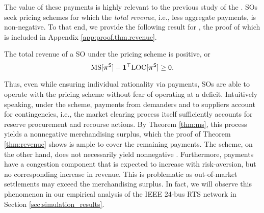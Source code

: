 The value of these \LOC{} payments is highly relevant to the previous study of the \MS{}. SOs seek pricing schemes for which the \emph{total revenue}, i.e., \MS{} less aggregate \LOC{} payments, is non-negative. To that end, we  provide the following result for \LMPmar{}, the proof of which is included in Appendix \ref{app:proof.thm.revenue}.
\begin{theorem}
  \label{thm:revenue}
  The total revenue of a SO under the pricing scheme \LMPmar{} is positive, or
  \begin{equation}
      {\rm MS}{}[{\bm{\pi}}^{{\sf S}}] - \mathbf{1}^\top {\rm LOC}{}[{\bm{\pi}}^{{\sf S}}] \ge 0.
  \end{equation}
\end{theorem}
Thus, even while ensuring individual rationality via \LOC{} payments, SOs are able to operate with the pricing scheme \LMPmar{} without fear of operating at a deficit. Intuitively speaking, under the \LMPmar{} scheme, payments from demanders and to suppliers account for contingencies, i.e., the market clearing process itself sufficiently accounts for reserve procurement and recourse actions. By Theorem \ref{thm:ms}, this process yields a nonnegative merchandising surplus, which the proof of Theorem \ref{thm:revenue} shows is ample to cover the remaining \LOC{} payments. The \LMPnom{} scheme, on the other hand, does not necessarily yield nonnegative \MS{}. Furthermore, \LMPnom{} \LOC{} payments have a congestion component that is expected to increase with risk-aversion, but no corresponding increase in revenue. This is problematic as out-of-market settlements may exceed the merchandising surplus. In fact, we will observe this phenomenon in our empirical analysis of the IEEE 24-bus RTS network in Section \ref{sec:simulation_results}. 

